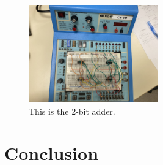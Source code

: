 \documentclass[11pt]{article}
\begin{document}
\begin{figure}[ht]\centering
	\includegraphics[width=0.5\textwidth]{2-bitadder}
	\caption{This is the 2-bit adder.}
	\label{fig:2-bit adder}			%
\end{figure}

\section*{Conclusion}
\end{document}
